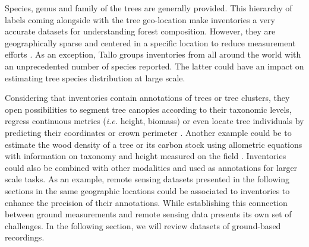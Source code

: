 \documentclass{CUP-JNL-DTM}%
\newcommand{\ELc}[1]{\textcolor{orange}{[\textbf{Eti}: #1]}}
\theoremstyle{definition}
\numberwithin{equation}{section}
\begin{document}
Species, genus and family of the trees are generally provided. 
This hierarchy of labels coming alongside with the tree geo-location make inventories a very accurate datasets for understanding forest composition.
However, they are geographically sparse and centered in a specific location to reduce measurement efforts \cite{laar_forest_2007, motz_sampling_2010}. 
As an exception, Tallo \cite{jucker_tallo_2022} groups inventories from all around the world with an unprecedented number of species reported. The latter could have an impact on estimating tree species distribution at large scale.

Considering that inventories contain annotations of trees or tree clusters, they open possibilities to segment tree canopies according to their taxonomic levels, regress continuous metrics (\textit{i.e.} height, biomass) or even locate tree individuals by predicting their coordinates or crown perimeter \cite{tucker_sub-continental-scale_2023}.
Another example could be to estimate the wood density of a tree or its carbon stock using allometric equations with information on taxonomy and height measured on the field \cite{zianis_biomass_2005}. 
Inventories could also be combined with other modalities and used as annotations for larger scale tasks.
As an example, remote sensing datasets presented in the following sections in the same geographic locations could be associated to inventories to enhance the precision of their annotations. 
While establishing this connection between ground measurements and remote sensing data presents its own set of challenges.
In the following section, we will review datasets of ground-based recordings.
\end{document}

